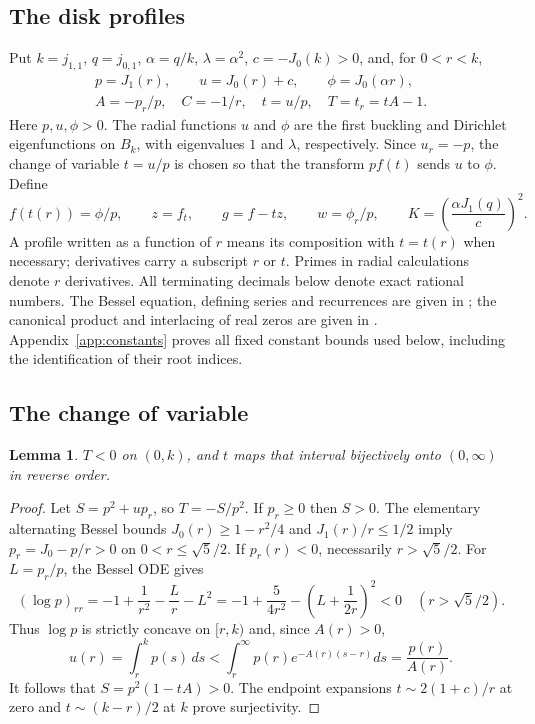 \documentclass[11pt,letterpaper,reqno]{amsart}
\newtheorem{lemma}[theorem]{Lemma}
\theoremstyle{definition}
\begin{document}
\subsection{The disk profiles}
Put $k=j_{1,1}$, $q=j_{0,1}$, $\alpha=q/k$,
$\lambda=\alpha^2$, $c=-J_0(k)>0$, and, for $0<r<k$,
\[
 \begin{gathered}
 p=J_1(r),\qquad u=J_0(r)+c,\qquad \phi=J_0(\alpha r),\\
 A=-p_r/p,\quad C=-1/r,\quad t=u/p,\quad T=t_r=tA-1.
 \end{gathered}
\]
Here $p,u,\phi>0$. The radial functions $u$ and $\phi$ are the
first buckling and Dirichlet eigenfunctions on $B_k$, with eigenvalues
$1$ and $\lambda$, respectively. Since $u_r=-p$, the change of variable
$t=u/p$ is chosen so that the transform $p f(t)$ sends $u$ to $\phi$.
Define
\[
 f(t(r))=\phi/p,\qquad z=f_t,\qquad g=f-tz,\qquad
 w=\phi_r/p,
 \qquad
 K=\left(\frac{\alpha J_1(q)}c\right)^2.
\]
A profile written as a function of $r$ means its composition with
$t=t(r)$ when necessary; derivatives carry a subscript $r$ or $t$. Primes in radial calculations
denote $r$ derivatives. All terminating decimals below denote exact
rational numbers.
The Bessel equation, defining series and recurrences are given in
\cite[Eqs.~10.2.1--10.2.2 and 10.6.1--10.6.3]{DLMF};
the canonical product and interlacing of real zeros are given in
\cite[Eqs.~10.21.15 and 10.21.2]{DLMF}.
Appendix~\ref{app:constants} proves all fixed constant bounds used below,
including the identification of their root indices.

\subsection{The change of variable}
\begin{lemma}
$T<0$ on $(0,k)$, and $t$ maps that interval bijectively onto $(0,\infty)$
in reverse order.
\end{lemma}
\begin{proof}
Let $S=p^2+up_r$, so $T=-S/p^2$. If $p_r\ge0$ then $S>0$.
The elementary alternating Bessel bounds
$J_0(r)\ge1-r^2/4$ and $J_1(r)/r\le1/2$ imply
$p_r=J_0-p/r>0$ on $0<r\le\sqrt5/2$.
If $p_r(r)<0$, necessarily $r>\sqrt5/2$. For $L=p_r/p$, the Bessel
ODE gives
\[
 (\log p)_{rr}
 =-1+\frac1{r^2}-\frac Lr-L^2
 =-1+\frac5{4r^2}-\left(L+\frac1{2r}\right)^2<0
 \quad(r>\sqrt5/2).
\]
Thus $\log p$ is strictly concave on $[r,k)$ and, since
$A(r)>0$,
\[
 u(r)=\int_r^k p(s)\,ds
 <\int_r^\infty p(r)e^{-A(r)(s-r)}ds=\frac{p(r)}{A(r)}.
\]
It follows that $S=p^2(1-tA)>0$. The endpoint expansions
$t\sim2(1+c)/r$ at zero and $t\sim(k-r)/2$ at $k$ prove surjectivity.
\end{proof}
\end{document}
